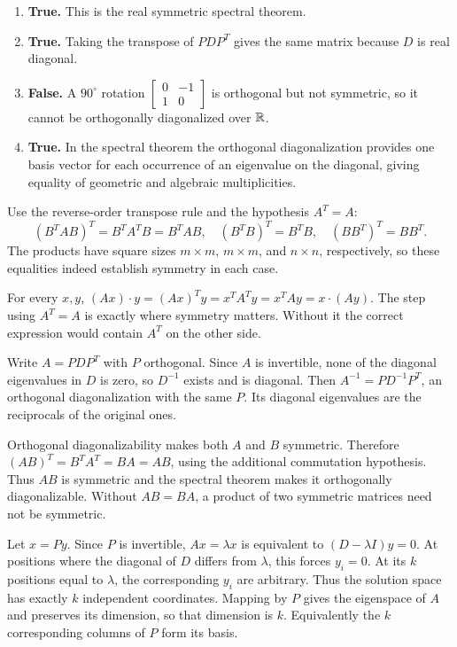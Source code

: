 \begin{enumerate}[label=(\alph*)]
\item \textbf{True.} This is the real symmetric spectral theorem.
\item \textbf{True.} Taking the transpose of $PDP^T$ gives the same
matrix because $D$ is real diagonal.
\item \textbf{False.} A $90^\circ$ rotation
$\begin{bmatrix}0&-1\\1&0\end{bmatrix}$ is orthogonal but not symmetric,
so it cannot be orthogonally diagonalized over $\mathbb{R}$.
\item \textbf{True.} In the spectral theorem the orthogonal
diagonalization provides one basis vector for each occurrence of an
eigenvalue on the diagonal, giving equality of geometric and algebraic multiplicities.
\end{enumerate}

Use the reverse-order transpose rule and the hypothesis $A^T=A$:
\[
 (B^TAB)^T=B^TA^TB=B^TAB,
 \quad (B^TB)^T=B^TB,
 \quad (BB^T)^T=BB^T.
\]
The products have square sizes $m\times m$, $m\times m$, and $n\times n$,
respectively, so these equalities indeed establish symmetry in each case.

For every $x,y$,
$(Ax)\cdot y=(Ax)^Ty=x^TA^Ty=x^TAy=x\cdot(Ay)$.
The step using $A^T=A$ is exactly where symmetry matters.
Without it the correct expression would contain $A^T$ on the other side.

Write $A=PDP^T$ with $P$ orthogonal. Since $A$ is invertible, none
of the diagonal eigenvalues in $D$ is zero, so $D^{-1}$ exists and is diagonal.
Then $A^{-1}=PD^{-1}P^T$, an orthogonal diagonalization with the same
$P$. Its diagonal eigenvalues are the reciprocals of the original ones.

Orthogonal diagonalizability makes both $A$ and $B$ symmetric.
Therefore $(AB)^T=B^TA^T=BA=AB$, using the additional commutation hypothesis.
Thus $AB$ is symmetric and the spectral theorem makes it orthogonally
diagonalizable. Without $AB=BA$, a product of two symmetric matrices need
not be symmetric.

Let $x=Py$. Since $P$ is invertible,
$Ax=\lambda x$ is equivalent to $(D-\lambda I)y=0$.
At positions where the diagonal of $D$ differs from $\lambda$, this forces
$y_i=0$. At its $k$ positions equal to $\lambda$, the corresponding
$y_i$ are arbitrary. Thus the solution space has exactly $k$ independent
coordinates. Mapping by $P$ gives the eigenspace of $A$ and preserves
its dimension, so that dimension is $k$.
Equivalently the $k$ corresponding columns of $P$ form its basis.

